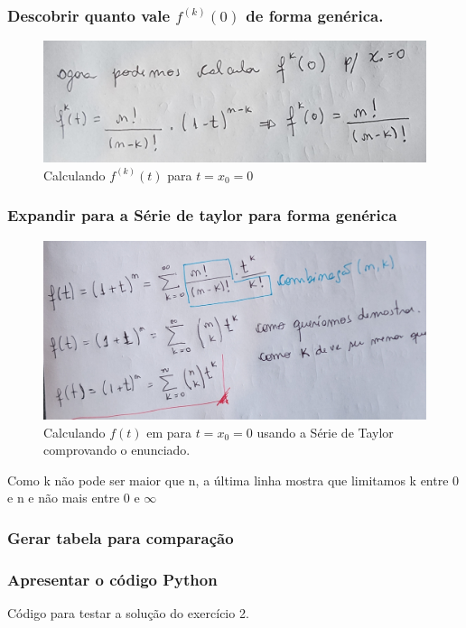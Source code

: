 \subsubsection{Descobrir quanto vale $f^{(k)}(0)$ de forma genérica.}
\begin{figure}[H]
    \centering
    \includegraphics[width=1.0\textwidth]{imagens/exercicio2_parte2}
    \caption{Calculando $f^{(k)}(t)$ para $t = x_0 = 0$}
    \label{fig:exe2_parte2}
\end{figure}

\subsubsection{Expandir para a Série de taylor para forma genérica}
\begin{figure}[H]
    \centering
    \includegraphics[width=1.0\textwidth]{imagens/exercicio2_parte3}
    \caption{Calculando $f(t)$ em para $t = x_0 = 0$ usando a Série de Taylor comprovando o enunciado.}
    \label{fig:exe2_parte3}
\end{figure}
Como k não pode ser maior que n, a última linha mostra que limitamos k entre 0 e n e não mais entre 0 e $\infty$

\subsubsection{Gerar tabela para comparação}

\newpage

\subsubsection{Apresentar o código Python}

Código para testar a solução do exercício 2.


